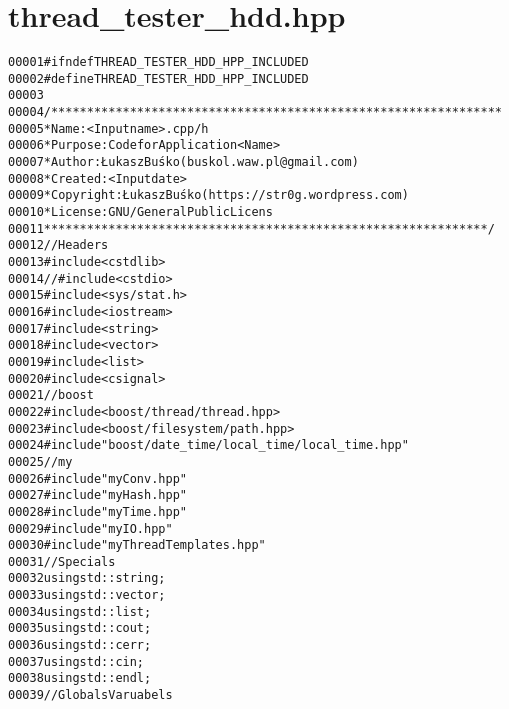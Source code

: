 \hypertarget{thread__tester__hdd_8hpp_source}{
\section{thread\_\-tester\_\-hdd.hpp}
}


\begin{footnotesize}\begin{alltt}
00001 \textcolor{preprocessor}{#ifndef THREAD\_TESTER\_HDD\_HPP\_INCLUDED}
00002 \textcolor{preprocessor}{}\textcolor{preprocessor}{#define THREAD\_TESTER\_HDD\_HPP\_INCLUDED}
00003 \textcolor{preprocessor}{}
00004 \textcolor{comment}{/***************************************************************}
00005 \textcolor{comment}{ * Name:      <Input name>.cpp/h}
00006 \textcolor{comment}{ * Purpose:   Code for Application <Name>}
00007 \textcolor{comment}{ * Author:    Łukasz Buśko (buskol.waw.pl@gmail.com)}
00008 \textcolor{comment}{ * Created:   <Input date>}
00009 \textcolor{comment}{ * Copyright: Łukasz Buśko (https://str0g.wordpress.com)}
00010 \textcolor{comment}{ * License:   GNU / General Public Licens}
00011 \textcolor{comment}{ **************************************************************/}
00012 \textcolor{comment}{//Headers}
00013 \textcolor{preprocessor}{#include <cstdlib>}
00014 \textcolor{comment}{//#include <cstdio>}
00015 \textcolor{preprocessor}{#include <sys/stat.h>}
00016 \textcolor{preprocessor}{#include <iostream>}
00017 \textcolor{preprocessor}{#include <string>}
00018 \textcolor{preprocessor}{#include <vector>}
00019 \textcolor{preprocessor}{#include <list>}
00020 \textcolor{preprocessor}{#include <csignal>}
00021 \textcolor{comment}{//boost}
00022 \textcolor{preprocessor}{#include <boost/thread/thread.hpp>}
00023 \textcolor{preprocessor}{#include <boost/filesystem/path.hpp>}
00024 \textcolor{preprocessor}{#include "boost/date\_time/local\_time/local\_time.hpp"}
00025 \textcolor{comment}{//my}
00026 \textcolor{preprocessor}{#include "myConv.hpp"}
00027 \textcolor{preprocessor}{#include "myHash.hpp"}
00028 \textcolor{preprocessor}{#include "myTime.hpp"}
00029 \textcolor{preprocessor}{#include "myIO.hpp"}
00030 \textcolor{preprocessor}{#include "myThreadTemplates.hpp"}
00031 \textcolor{comment}{//Specials}
00032 \textcolor{keyword}{using} std::string;
00033 \textcolor{keyword}{using} std::vector;
00034 \textcolor{keyword}{using} std::list;
00035 \textcolor{keyword}{using} std::cout;
00036 \textcolor{keyword}{using} std::cerr;
00037 \textcolor{keyword}{using} std::cin;
00038 \textcolor{keyword}{using} std::endl;
00039 \textcolor{comment}{//Globals Varuabels}

\end{alltt}
\end{footnotesize}
